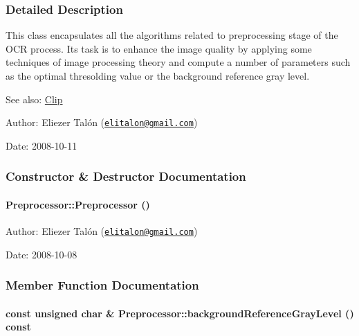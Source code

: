 \subsubsection{Detailed Description}
This class encapsulates all the algorithms related to preprocessing stage of the OCR process. Its task is to enhance the image quality by applying some techniques of image processing theory and compute a number of parameters such as the optimal thresolding value or the background reference gray level.

\begin{Desc}
\item[See also:]\hyperlink{class_clip}{Clip}\end{Desc}
\begin{Desc}
\item[Author:]Eliezer Talón (\href{mailto:elitalon@gmail.com}{\tt elitalon@gmail.com}) \end{Desc}
\begin{Desc}
\item[Date:]2008-10-11 \end{Desc}


\subsubsection{Constructor \& Destructor Documentation}
\hypertarget{class_preprocessor_da966c8b83e7c3bcd8759549c3cdf688}{
\paragraph[{Preprocessor}]{\setlength{\rightskip}{0pt plus 5cm}Preprocessor::Preprocessor ()}\hfill}
\label{class_preprocessor_da966c8b83e7c3bcd8759549c3cdf688}


\begin{Desc}
\item[Author:]Eliezer Talón (\href{mailto:elitalon@gmail.com}{\tt elitalon@gmail.com}) \end{Desc}
\begin{Desc}
\item[Date:]2008-10-08 \end{Desc}


\subsubsection{Member Function Documentation}
\hypertarget{class_preprocessor_b435116619b7b254d9e788476c012e8a}{
\paragraph[{backgroundReferenceGrayLevel}]{\setlength{\rightskip}{0pt plus 5cm}const unsigned char \& Preprocessor::backgroundReferenceGrayLevel () const}\hfill}
\label{class_preprocessor_b435116619b7b254d9e788476c012e8a}


